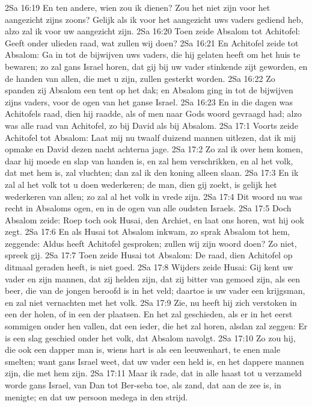 2Sa 16:19  En ten andere, wien zou ik dienen? Zou het niet zijn voor het aangezicht zijns zoons? Gelijk als ik voor het aangezicht uws vaders gediend heb, alzo zal ik voor uw aangezicht zijn.
2Sa 16:20  Toen zeide Absalom tot Achitofel: Geeft onder ulieden raad, wat zullen wij doen?
2Sa 16:21  En Achitofel zeide tot Absalom: Ga in tot de bijwijven uws vaders, die hij gelaten heeft om het huis te bewaren; zo zal gans Israel horen, dat gij bij uw vader stinkende zijt geworden, en de handen van allen, die met u zijn, zullen gesterkt worden.
2Sa 16:22  Zo spanden zij Absalom een tent op het dak; en Absalom ging in tot de bijwijven zijns vaders, voor de ogen van het ganse Israel.
2Sa 16:23  En in die dagen was Achitofels raad, dien hij raadde, als of men naar Gods woord gevraagd had; alzo was alle raad van Achitofel, zo bij David als bij Absalom.
2Sa 17:1  Voorts zeide Achitofel tot Absalom: Laat mij nu twaalf duizend mannen uitlezen, dat ik mij opmake en David dezen nacht achterna jage.
2Sa 17:2  Zo zal ik over hem komen, daar hij moede en slap van handen is, en zal hem verschrikken, en al het volk, dat met hem is, zal vluchten; dan zal ik den koning alleen slaan.
2Sa 17:3  En ik zal al het volk tot u doen wederkeren; de man, dien gij zoekt, is gelijk het wederkeren van allen; zo zal al het volk in vrede zijn.
2Sa 17:4  Dit woord nu was recht in Absaloms ogen, en in de ogen van alle oudsten Israels.
2Sa 17:5  Doch Absalom zeide: Roep toch ook Husai, den Archiet, en laat ons horen, wat hij ook zegt.
2Sa 17:6  En als Husai tot Absalom inkwam, zo sprak Absalom tot hem, zeggende: Aldus heeft Achitofel gesproken; zullen wij zijn woord doen? Zo niet, spreek gij.
2Sa 17:7  Toen zeide Husai tot Absalom: De raad, dien Achitofel op ditmaal geraden heeft, is niet goed.
2Sa 17:8  Wijders zeide Husai: Gij kent uw vader en zijn mannen, dat zij helden zijn, dat zij bitter van gemoed zijn, als een beer, die van de jongen beroofd is in het veld; daartoe is uw vader een krijgsman, en zal niet vernachten met het volk.
2Sa 17:9  Zie, nu heeft hij zich verstoken in een der holen, of in een der plaatsen. En het zal geschieden, als er in het eerst sommigen onder hen vallen, dat een ieder, die het zal horen, alsdan zal zeggen: Er is een slag geschied onder het volk, dat Absalom navolgt.
2Sa 17:10  Zo zou hij, die ook een dapper man is, wiens hart is als een leeuwenhart, te enen male smelten; want gans Israel weet, dat uw vader een held is, en het dappere mannen zijn, die met hem zijn.
2Sa 17:11  Maar ik rade, dat in alle haast tot u verzameld worde gans Israel, van Dan tot Ber-seba toe, als zand, dat aan de zee is, in menigte; en dat uw persoon medega in den strijd.
